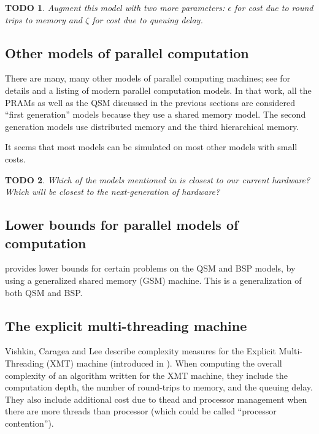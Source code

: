 \documentclass{article}
\newtheorem{todo}{TODO}
\begin{document}
\begin{todo}
  Augment this model with two more parameters: $\epsilon$ for cost due to round trips to memory and $\zeta$ for cost due to queuing delay.
\end{todo}

\subsection{Other models of parallel computation}

There are many, many other models of parallel computing machines; see \cite{zcsm07} for details and a listing of modern parallel computation models.
In that work, all the PRAMs as well as the QSM discussed in the previous sections are considered ``first generation'' models because they use a shared memory model.
The second generation models use distributed memory and the third hierarchical memory.

It seems that most models can be simulated on most other models with small costs.

\begin{todo}
  Which of the models mentioned in \cite{zcsm07} is closest to our current hardware?
  Which will be closest to the next-generation of hardware?
\end{todo}

\subsection{Lower bounds for parallel models of computation}

\cite{mr98} provides lower bounds for certain problems on the QSM and BSP models, by using a generalized shared memory (GSM) machine.
This is a generalization of both QSM and BSP.

\subsection{The explicit multi-threading machine}
Vishkin, Caragea and Lee \cite{vcl06} describe complexity measures for the Explicit Multi-Threading (XMT) machine (introduced in \cite{vdbn98}).
When computing the overall complexity of an algorithm written for the XMT machine, they include the computation depth, the number of round-trips to memory, and the queuing delay.
They also include additional cost due to thead and processor management when there are more threads than processor (which could be called ``processor contention'').
\end{document}
